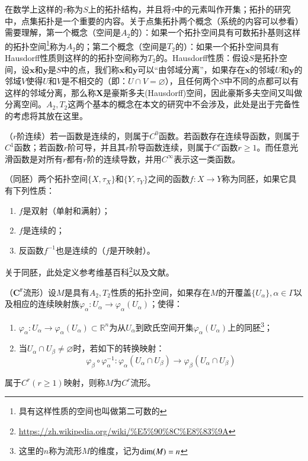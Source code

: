 在数学上这样的$\tau$称为$S$上的拓扑结构，并且将$\tau$中的元素叫作开集；拓扑的研究中，点集拓扑是一个重要的内容。关于点集拓扑两个概念（系统的内容可以参看\cite{Manifold}）需要理解，第一个概念（空间是$A_2$的）：如果一个拓扑空间具有可数拓扑基则这样的拓扑空间\footnote{具有这样性质的空间也叫做{\heiti 第二可数的}}称为$A_2$的；第二个概念（空间是$T_2$的）：如果一个拓扑空间具有Hausdorff性质则这样的的拓扑空间称为$T_2$的。Hausdorff性质：假设$S$是拓扑空间，设$\bm{x}$和$\bm{y}$是$S$中的点，我们称$\bm{x}$和$\bm{y}$可以“由邻域分离”，如果存在$\bm{x}$的邻域$U$和$\bm{y}$的邻域$V$使得$U$和$V$是不相交的（即：$U \cap V = \varnothing$），且任何两个$S$中不同的点都可以有这样的邻域分离，那么称$\bm{X}$是豪斯多夫(Hausdorff)空间，因此豪斯多夫空间又叫做分离空间。$A_2,T_2$这两个基本的概念在本文的研究中不会涉及，此处是出于完备性的考虑将其放在这里。
\begin{definition}
\label{C_r_Continuous}
{\heiti（$r$阶连续）}若一函数是连续的，则属于$C^0$函数。若函数存在连续导函数，则属于$C^1$函数；若函数$r$阶可导，并且其$r$阶导函数连续，则属于$C^r$函数$r \geq 1$。而任意光滑函数是对所有$r$都有$r$阶的连续导数，并用$C^\infty$表示这一类函数。
\end{definition}
\begin{definition}
\label{Homeomorphism}
{\heiti（同胚）}两个拓扑空间$\{X,\tau_X\}$和$\{Y,\tau_Y\}$之间的函数$f:X \rightarrow Y$称为同胚，如果它具有下列性质：
\begin{enumerate}
\item $f$是双射（单射和满射）；
\item $f$是连续的；
\item 反函数$f^{-1}$也是连续的（$f$是开映射）。
\end{enumerate}
\end{definition}
关于同胚，此处定义参考维基百科\footnote{\url{https://zh.wikipedia.org/wiki/\%E5\%90\%8C\%E8\%83\%9A}}以及文献\cite{Manifold}。
\begin{definition}
\label{C_r_Manifold}
{\heiti（$\bm{C^r}$流形）}设$M$是具有$A_2,T_2$性质的拓扑空间，如果存在$M$的开覆盖$\{U_\alpha\},{\alpha \in \Gamma}$以及相应的连续映射族$\varphi_\alpha:U_\alpha \rightarrow \varphi_\alpha(U_\alpha)$；使得：
\begin{enumerate}
\item $\varphi_\alpha:U_\alpha \rightarrow \varphi_\alpha(U_\alpha) \subset \mathbb{R}^{n}$为从$U_\alpha$到欧氏空间开集$\varphi_\alpha(U_\alpha)$上的同胚\footnote{这里的$n$称为流形$M$的维度，记为${\rm dim}(M)=n$}；
\item 当$U_\alpha \cap U_\beta \neq \varnothing$时，若如下的转换映射：
\begin{displaymath}
\varphi_{\beta} \circ \varphi_{\alpha}^{-1}:\varphi_\alpha(U_\alpha \cap U_\beta) \rightarrow \varphi_\beta(U_\alpha \cap U_\beta)
\end{displaymath}
\end{enumerate}
属于$C^r(r\geq 1)$映射，则称$M$为$C^r$流形。
\end{definition}

